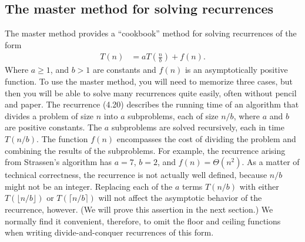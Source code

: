 \documentclass{report}
\begin{document}
        \subsection{The master method for solving recurrences}
        \bigbreak \noindent 
        The master method provides a “cookbook” method for solving recurrences of the form
        \begin{align*}
            T(n) &= aT\left(\frac{n}{b}\right) + f(n)
        .\end{align*}
        Where $a \geq 1$, and $b > 1 $ are constants and $f(n)$ is an asymptotically positive function. To use the master method, you will need to memorize three cases, but then you will be able to solve many recurrences quite easily, often without pencil and paper.
        \bigbreak \noindent 
        The recurrence (4.20) describes the running time of an algorithm that divides a problem of size \( n \) into \( a \) subproblems, each of size \( n/b \), where \( a \) and \( b \) are positive constants. The \( a \) subproblems are solved recursively, each in time \( T(n/b) \). The function \( f(n) \) encompasses the cost of dividing the problem and combining the results of the subproblems. For example, the recurrence arising from Strassen’s algorithm has \( a = 7 \), \( b = 2 \), and \( f(n) = \Theta(n^2) \).
        \bigbreak \noindent 
        As a matter of technical correctness, the recurrence is not actually well defined, because \( n/b \) might not be an integer. Replacing each of the \( a \) terms \( T(n/b) \) with either \( T(\lfloor n/b \rfloor) \) or \( T(\lceil n/b \rceil) \) will not affect the asymptotic behavior of the recurrence, however. (We will prove this assertion in the next section.) We normally find it convenient, therefore, to omit the floor and ceiling functions when writing divide-and-conquer recurrences of this form.
        \bigbreak \noindent 
\end{document}

